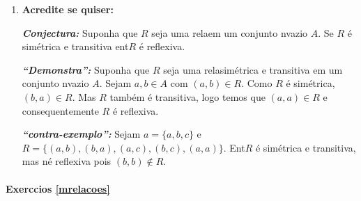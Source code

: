 \begin{enumerate}[{\bf 1.}]
\noindent \textit{\textbf{Conjectura:}} Suponha que $R$ seja uma rela\cao em um conjunto n\ao vazio $A$. Se $R$ \'e n\ao sim\'etrica ent\ao $R$ \'e assim\'etrica. 

\noindent \textit{\textbf{``Demonstra\caoi'':}} Seja $R$ uma rela\cao em um conjunto n\ao vazio $A$. Suponha $a,b\in A$ com $(a,b)\in R$. Como $R$ n\ao \'e sim\'etrica, $(b,a)\notin R$ logo $R$ \'e assim\'etrica.

\noindent \textit{\textbf{``contra-exemplo'':}} Sejam $A=\{1,2,3\}$ e $R=\{(1,2),(2,1),(1,3)\}$. Ent\ao $R$ n\ao \'e sim\'etrica nem assim\'etrica.

\item {\bf Acredite se quiser:}  

\noindent \textit{\textbf{Conjectura:}} Suponha que $R$ seja uma rela\cao em um conjunto n\ao vazio $A$. Se $R$ \'e sim\'etrica e transitiva ent\ao $R$ \'e reflexiva. 

\noindent \textit{\textbf{``Demonstra\caoi'':}} Suponha que $R$ seja uma rela\cao sim\'etrica e transitiva em um conjunto n\ao vazio $A$. Sejam $a,b\in A$ com $(a,b)\in R$. Como $R$ \'e sim\'etrica, $(b,a)\in R$. Mas $R$ tamb\'em \'e transitiva, logo temos que $(a,a)\in R$ e consequentemente $R$ \'e reflexiva.

\noindent \textit{\textbf{``contra-exemplo'':}} Sejam $a=\{a,b,c\}$ e $R=\{(a,b), (b,a), (a,c), (b,c), (a,a)\}$. Ent\ao $R$ \'e sim\'etrica e transitiva, mas n\ao \'e reflexiva pois $(b,b)\notin R$.
\end{enumerate}
\paragraph{Exerc\ih cios \ref{mrelacoes}}

